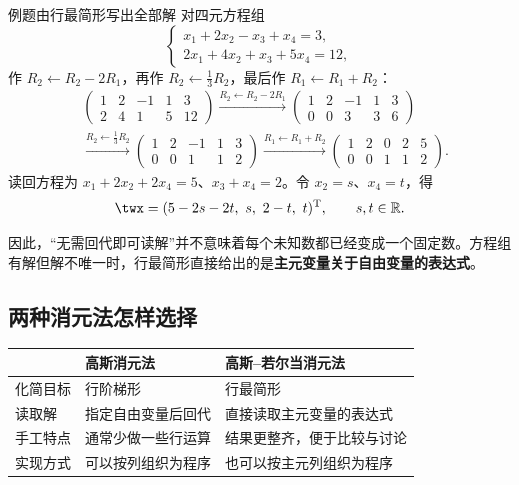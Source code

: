\documentclass[a4paper,12pt,twoside,openany,fontset=none]{ctexbook}
\newcounter{example}[chapter]
\newenvironment{example}[1][]{\begin{exBox}{例题}{#1}}{\end{exBox}}
\numberwithin{equation}{chapter}
\begin{document}
\begin{example}[由行最简形写出全部解]
对四元方程组
\[
    \begin{cases}
    x_1+2x_2-x_3+x_4=3,\\
    2x_1+4x_2+x_3+5x_4=12,
    \end{cases}
\]
作 $R_2\leftarrow R_2-2R_1$，再作 $R_2\leftarrow\tfrac13R_2$，最后作 $R_1\leftarrow R_1+R_2$：
\[
\begin{aligned}
 &\left(\begin{array}{rrrr|r}1&2&-1&1&3\\2&4&1&5&12\end{array}\right)
 \xrightarrow{R_2\leftarrow R_2-2R_1}
 \left(\begin{array}{rrrr|r}1&2&-1&1&3\\0&0&3&3&6\end{array}\right)\\[5pt]
 &\xrightarrow{R_2\leftarrow\frac13R_2}
 \left(\begin{array}{rrrr|r}1&2&-1&1&3\\0&0&1&1&2\end{array}\right)
 \xrightarrow{R_1\leftarrow R_1+R_2}
 \left(\begin{array}{rrrr|r}1&2&0&2&5\\0&0&1&1&2\end{array}\right).
\end{aligned}
\]
读回方程为 $x_1+2x_2+2x_4=5$、$x_3+x_4=2$。令 $x_2=s$、$x_4=t$，得
\[
    \twx=(5-2s-2t,\ s,\ 2-t,\ t)^{\mathrm T},\qquad s,t\in\mathbb R.
\]
\end{example}

因此，“无需回代即可读解”并不意味着每个未知数都已经变成一个固定数。方程组有解但解不唯一时，行最简形直接给出的是\textbf{主元变量关于自由变量的表达式}。

\subsection*{两种消元法怎样选择}

\noindent\begin{tabular}{@{}p{.20\linewidth}p{.35\linewidth}p{.37\linewidth}@{}}
\toprule
 & 高斯消元法 & 高斯--若尔当消元法\\
\midrule
化简目标 & 行阶梯形 & 行最简形\\[4pt]
读取解 & 指定自由变量后回代 & 直接读取主元变量的表达式\\[4pt]
手工特点 & 通常少做一些行运算 & 结果更整齐，便于比较与讨论\\[4pt]
实现方式 & 可以按列组织为程序 & 也可以按主元列组织为程序\\
\bottomrule
\end{tabular}
\end{document}
